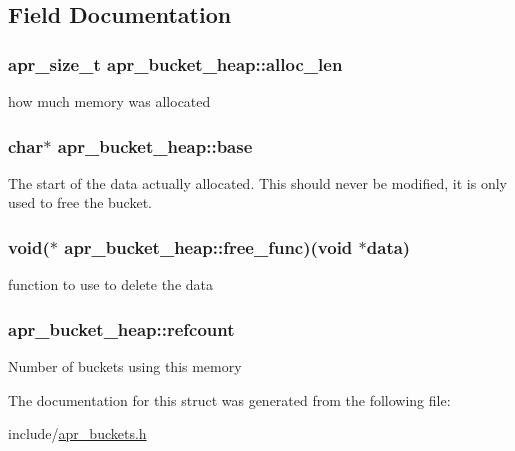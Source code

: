 \subsection{Field Documentation}
\hypertarget{structapr__bucket__heap_ae373dada96f2e005a6aaf80e41c4cf6d}{
\subsubsection[{alloc\-\_\-len}]{\setlength{\rightskip}{0pt plus 5cm}apr\-\_\-size\-\_\-t apr\-\_\-bucket\-\_\-heap\-::alloc\-\_\-len}}\label{structapr__bucket__heap_ae373dada96f2e005a6aaf80e41c4cf6d}
how much memory was allocated \hypertarget{structapr__bucket__heap_ac6386e2f635c6af19075123749e1fa71}{
\subsubsection[{base}]{\setlength{\rightskip}{0pt plus 5cm}char$\ast$ apr\-\_\-bucket\-\_\-heap\-::base}}\label{structapr__bucket__heap_ac6386e2f635c6af19075123749e1fa71}
The start of the data actually allocated. This should never be modified, it is only used to free the bucket. \hypertarget{structapr__bucket__heap_aac6fce0089a10b2b139c28edf9ad6fea}{
\subsubsection[{free\-\_\-func}]{\setlength{\rightskip}{0pt plus 5cm}void($\ast$ apr\-\_\-bucket\-\_\-heap\-::free\-\_\-func)(void $\ast$data)}}\label{structapr__bucket__heap_aac6fce0089a10b2b139c28edf9ad6fea}
function to use to delete the data \hypertarget{structapr__bucket__heap_ab87003dea25caef69aa3b30a1948024e}{
\subsubsection[{refcount}]{ apr\-\_\-bucket\-\_\-heap\-::refcount}}\label{structapr__bucket__heap_ab87003dea25caef69aa3b30a1948024e}
Number of buckets using this memory 

The documentation for this struct was generated from the following file\-:\begin{DoxyCompactItemize}
\item 
include/\hyperlink{apr__buckets_8h}{apr\-\_\-buckets.\-h}\end{DoxyCompactItemize}
